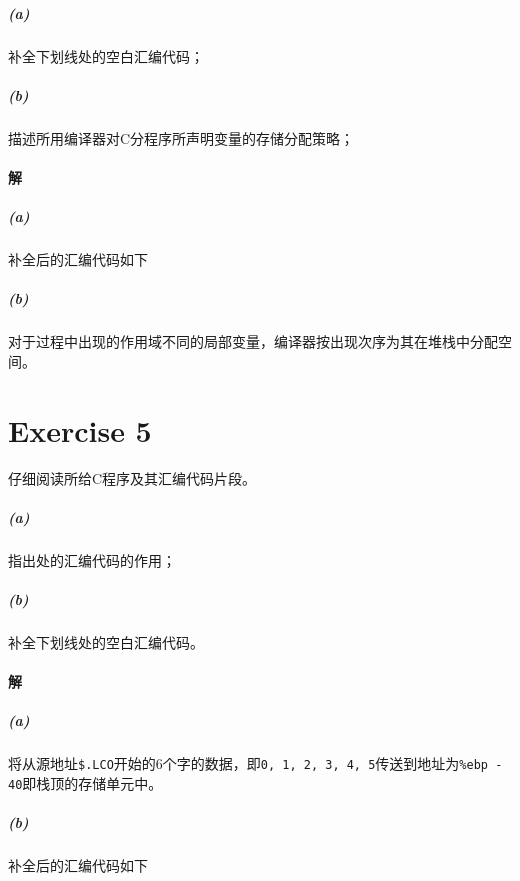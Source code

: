 \documentclass{article}
\newcommand{\CodeBlock}[2]{
    \begin{figure}[H]
        \begin{mdframed}[
            style = Default,
        ]
            
        \end{mdframed}
    \end{figure}
}
\begin{document}
\CodeBlock{C}{./Ex4.c}

\CodeBlock{Assembler}{./Ex4_Unfilled.s}

\subparagraph*{(a)}
补全下划线处的空白汇编代码；
\subparagraph*{(b)}
描述所用编译器对C分程序所声明变量的存储分配策略；

\paragraph{解}
\subparagraph*{(a)}
补全后的汇编代码如下

\CodeBlock{Assembler}{./Ex4_Filled.s}

\subparagraph*{(b)}
对于过程中出现的作用域不同的局部变量，编译器按出现次序为其在堆栈中分配空间。

\section*{Exercise 5}
仔细阅读所给C程序及其汇编代码片段。
\subparagraph*{(a)}
指出处的汇编代码的作用；
\subparagraph*{(b)}
补全下划线处的空白汇编代码。

\CodeBlock{C}{./Ex5.c}

\CodeBlock{Assembler}{./Ex5_Unfilled.s}

\paragraph{解}
\subparagraph*{(a)}
将从源地址\lstinline[style = Assembler]{$.LCO}开始的6个字的数据，即\lstinline{0, 1, 2, 3, 4, 5}传送到地址为\lstinline[style = Assembler]{%ebp - 40}即栈顶的存储单元中。
\subparagraph*{(b)}
补全后的汇编代码如下
\CodeBlock{Assembler}{./Ex5_Filled.s}
\end{document}

